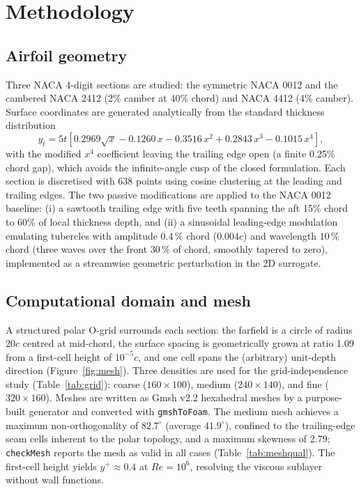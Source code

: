 \documentclass[11pt,a4paper]{article}
\begin{document}
\section{Methodology}\label{sec:method}

\subsection{Airfoil geometry}
Three NACA 4-digit sections are studied: the symmetric NACA 0012 and the cambered NACA 2412 (2\% camber at 40\% chord) and NACA 4412 (4\% camber). Surface coordinates are generated analytically from the standard thickness distribution
\begin{equation}
  y_t = 5t\left[0.2969\sqrt{x} - 0.1260\,x - 0.3516\,x^2 + 0.2843\,x^3 - 0.1015\,x^4\right],
\end{equation}
with the modified $x^4$ coefficient leaving the trailing edge open (a finite 0.25\% chord gap), which avoids the infinite-angle cusp of the closed formulation. Each section is discretised with 638 points using cosine clustering at the leading and trailing edges. The two passive modifications are applied to the NACA 0012 baseline: (i) a sawtooth trailing edge with five teeth spanning the aft 15\% chord to 60\% of local thickness depth, and (ii) a sinusoidal leading-edge modulation emulating tubercles with amplitude $0.4\,\%$ chord ($0.004c$) and wavelength $10\,\%$ chord (three waves over the front $30\,\%$ of chord, smoothly tapered to zero), implemented as a streamwise geometric perturbation in the 2D surrogate.

\subsection{Computational domain and mesh}
A structured polar O-grid surrounds each section: the farfield is a circle of radius $20c$ centred at mid-chord, the surface spacing is geometrically grown at ratio 1.09 from a first-cell height of $10^{-5}c$, and one cell spans the (arbitrary) unit-depth direction (Figure~\ref{fig:mesh}). Three densities are used for the grid-independence study (Table~\ref{tab:grid}): coarse ($160\times100$), medium ($240\times140$), and fine ($320\times160$). Meshes are written as Gmsh v2.2 hexahedral meshes by a purpose-built generator and converted with \texttt{gmshToFoam}. The medium mesh achieves a maximum non-orthogonality of $82.7^\circ$ (average $41.9^\circ$), confined to the trailing-edge seam cells inherent to the polar topology, and a maximum skewness of 2.79; \texttt{checkMesh} reports the mesh as valid in all cases (Table~\ref{tab:meshqual}). The first-cell height yields $y^+ \approx 0.4$ at $Re=10^6$, resolving the viscous sublayer without wall functions.
\end{document}
